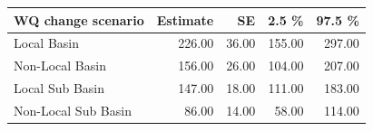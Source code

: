 \begin{table}[ht]
\centering
\begin{tabular}{lrrrr}
  \hline
WQ change scenario & Estimate & SE & 2.5 \% & 97.5 \% \\ 
  \hline
Local Basin & 226.00 & 36.00 & 155.00 & 297.00 \\ 
  Non-Local Basin & 156.00 & 26.00 & 104.00 & 207.00 \\ 
  Local Sub Basin & 147.00 & 18.00 & 111.00 & 183.00 \\ 
  Non-Local Sub Basin & 86.00 & 14.00 & 58.00 & 114.00 \\ 
   \hline
\end{tabular}
\end{table}
